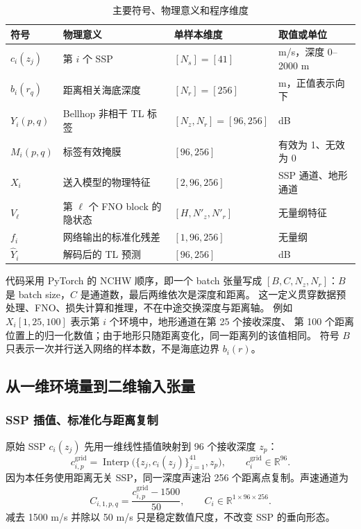 \documentclass[UTF8,11pt]{ctexart}
\begin{document}
\begin{table}[H]
\centering
\caption{主要符号、物理意义和程序维度}
\begin{tabularx}{\textwidth}{L{2.2cm}L{3.2cm}L{3.0cm}Y}
\toprule
符号 & 物理意义 & 单样本维度 & 取值或单位 \\
\midrule
$c_i(z_j)$ & 第 $i$ 个 SSP & $[N_s]=[41]$ & m/s，深度 0--2000 m \\
$b_i(r_q)$ & 距离相关海底深度 & $[N_r]=[256]$ & m，正值表示向下 \\
$Y_i(p,q)$ & Bellhop 非相干 TL 标签 & $[N_z,N_r]=[96,256]$ & dB \\
$M_i(p,q)$ & 标签有效掩膜 & $[96,256]$ & 有效为 1、无效为 0 \\
$X_i$ & 送入模型的物理特征 & $[2,96,256]$ & SSP 通道、地形通道 \\
$V_\ell$ & 第 $\ell$ 个 FNO block 的隐状态 & $[H,N'_z,N'_r]$ & 无量纲特征 \\
$f_i$ & 网络输出的标准化残差 & $[1,96,256]$ & 无量纲 \\
$\hat Y_i$ & 解码后的 TL 预测 & $[96,256]$ & dB \\
\bottomrule
\end{tabularx}
\end{table}

代码采用 PyTorch 的 NCHW 顺序，即一个 batch 张量写成
$[B,C,N_z,N_r]$：$B$ 是 batch size，$C$ 是通道数，最后两维依次是深度和距离。
这一定义贯穿数据预处理、FNO、损失计算和推理，不在中途交换深度与距离轴。
例如 $X_i[1,25,100]$ 表示第 $i$ 个环境中，地形通道在第 25 个接收深度、
第 100 个距离位置上的归一化数值；由于地形只随距离变化，同一距离列的该值相同。
符号 $B$ 只表示一次并行送入网络的样本数，不是海底边界 $b_i(r)$。

\subsection{从一维环境量到二维输入张量}

\subsubsection{SSP 插值、标准化与距离复制}

原始 SSP $c_i(z_j)$ 先用一维线性插值映射到 96 个接收深度 $z_p$：
\begin{equation}
  c^{\mathrm{grid}}_{i,p}=\operatorname{Interp}
  \big(\{z_j,c_i(z_j)\}_{j=1}^{41},z_p\big),
  \qquad c^{\mathrm{grid}}_i\in\mathbb{R}^{96}.
\end{equation}
因为本任务使用距离无关 SSP，同一深度声速沿 256 个距离点复制。声速通道为
\begin{equation}
  C_{i,1,p,q}=\frac{c^{\mathrm{grid}}_{i,p}-1500}{50},\qquad
  C_i\in\mathbb{R}^{1\times96\times256}.
\end{equation}
减去 1500 m/s 并除以 50 m/s 只是稳定数值尺度，不改变 SSP 的垂向形态。
\end{document}
